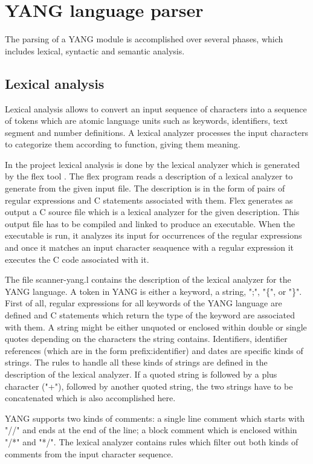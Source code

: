 \documentclass[conference]{IEEEtran}
\begin{document}
\section{YANG language parser}
The parsing of a YANG module is accomplished over several phases, which includes lexical, syntactic and semantic analysis.
\subsection{Lexical analysis}
Lexical analysis allows to convert an input sequence of characters into a sequence of tokens which are atomic language units such as keywords, identifiers, text segment and number definitions. A lexical analyzer processes the input characters to categorize them according to function, giving them meaning.

In the project lexical analysis is done by the lexical analyzer which is generated by the flex tool \cite{bib5}. The flex program reads a description of a lexical analyzer to generate from the given input file. The description is in the form of pairs of regular expressions and C statements associated with them. Flex generates as output a C source file which is a lexical analyzer for the given description. This output file has to be compiled and linked to produce an executable. When the executable is run, it analyzes its input for occurrences of the regular expressions and once it matches an input character seaquence with a regular expression it executes the C code associated with it.

The file scanner-yang.l contains the description of the lexical analyzer for the YANG language. A token in YANG is either a keyword, a string, ";", "\{", or "\}". First of all, regular expressions for all keywords of the YANG language are defined and C statements which return the type of the keyword are associated with them. A string might be either unquoted  or enclosed within double or single quotes depending on the characters the string contains. Identifiers, identifier references (which are in the form prefix:identifier) and dates  are specific kinds of strings. The rules to handle all these kinds of strings are defined in the description of the lexical analyzer. If a quoted string is followed by a plus character ("+"), followed by
 another quoted string, the two strings have to be concatenated which is also accomplished here.

YANG supports two kinds of comments: a single line comment which starts with "//" and  ends at the end of the line; a block comment which is enclosed within "/*"  and "*/". The lexical analyzer contains rules which filter out both kinds of comments from the input character sequence.
\end{document}
